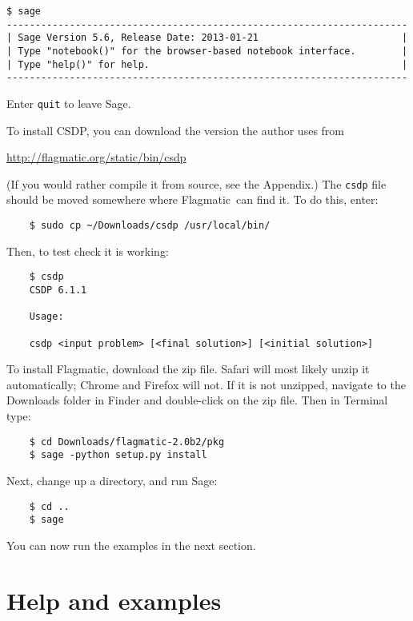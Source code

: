 \documentclass{article}
\providecommand{\flagmatic}{Flagmatic}
\begin{document}
\begin{verbatim}
$ sage
----------------------------------------------------------------------
| Sage Version 5.6, Release Date: 2013-01-21                         |
| Type "notebook()" for the browser-based notebook interface.        |
| Type "help()" for help.                                            |
----------------------------------------------------------------------
\end{verbatim}

Enter \verb|quit| to leave Sage. 

To install CSDP, you can download the version the author uses from

\url{http://flagmatic.org/static/bin/csdp}

(If you would rather compile it from source, see the Appendix.) The \verb|csdp| file should be moved somewhere where \flagmatic\ can find it. To do this, enter:

\begin{verbatim}
    $ sudo cp ~/Downloads/csdp /usr/local/bin/
\end{verbatim}

Then, to test check it is working:

\begin{verbatim}
    $ csdp
    CSDP 6.1.1
 
    Usage: 

    csdp <input problem> [<final solution>] [<initial solution>]
\end{verbatim}

To install Flagmatic, download the zip file. Safari will most likely unzip it automatically; Chrome and Firefox will not. If it is not unzipped, navigate to the Downloads folder in Finder and double-click on the zip file. Then in Terminal type:

\begin{verbatim}
    $ cd Downloads/flagmatic-2.0b2/pkg
    $ sage -python setup.py install
\end{verbatim}

Next, change up a directory, and run Sage:

\begin{verbatim}
    $ cd ..
    $ sage
\end{verbatim}

You can now run the examples in the next section.
    

\section{Help and examples}
\end{document}
